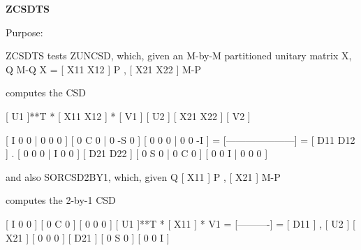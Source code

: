 {\bfseries Z\+C\+S\+D\+T\+S} 

\begin{DoxyParagraph}{Purpose\+: }
\begin{DoxyVerb} ZCSDTS tests ZUNCSD, which, given an M-by-M partitioned unitary
 matrix X,
              Q  M-Q
       X = [ X11 X12 ] P   ,
           [ X21 X22 ] M-P

 computes the CSD

       [ U1    ]**T * [ X11 X12 ] * [ V1    ]
       [    U2 ]      [ X21 X22 ]   [    V2 ]

                             [  I  0  0 |  0  0  0 ]
                             [  0  C  0 |  0 -S  0 ]
                             [  0  0  0 |  0  0 -I ]
                           = [---------------------] = [ D11 D12 ] .
                             [  0  0  0 |  I  0  0 ]   [ D21 D22 ]
                             [  0  S  0 |  0  C  0 ]
                             [  0  0  I |  0  0  0 ]

 and also SORCSD2BY1, which, given
          Q
       [ X11 ] P   ,
       [ X21 ] M-P

 computes the 2-by-1 CSD

                                     [  I  0  0 ]
                                     [  0  C  0 ]
                                     [  0  0  0 ]
       [ U1    ]**T * [ X11 ] * V1 = [----------] = [ D11 ] ,
       [    U2 ]      [ X21 ]        [  0  0  0 ]   [ D21 ]
                                     [  0  S  0 ]
                                     [  0  0  I ]\end{DoxyVerb}
 
\end{DoxyParagraph}

